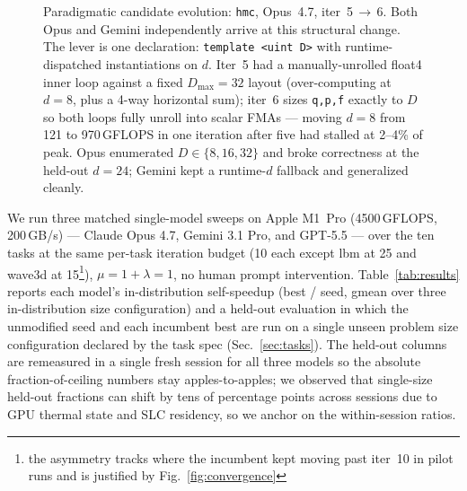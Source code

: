 \documentclass{article}
\theoremstyle{plain}
\theoremstyle{definition}
\theoremstyle{remark}
\begin{document}
\begin{figure}[!t]
\caption{Paradigmatic candidate evolution: \texttt{hmc}, Opus~4.7, iter~5\,$\rightarrow$\,6.
Both Opus and Gemini independently arrive at this structural change.
The lever is one declaration: \texttt{template <uint D>}
with runtime-dispatched instantiations on $d$. Iter~5 had a
manually-unrolled float4 inner loop against a fixed $D_{\max}{=}32$ layout
(over-computing at $d{=}8$, plus a 4-way horizontal sum); iter~6 sizes
\texttt{q,p,f} exactly to $D$ so both loops fully unroll into scalar FMAs ---
moving $d{=}8$ from 121 to 970\,GFLOPS in one iteration after five had
stalled at 2--4\% of peak. Opus enumerated $D{\in}\{8,16,32\}$ and broke
correctness at the held-out $d{=}24$; Gemini kept a runtime-$d$ fallback
and generalized cleanly.}
\label{fig:hmc-evol}
\end{figure}

We run three matched single-model sweeps on Apple M1~Pro (4500\,GFLOPS, 200\,GB/s) ---
Claude Opus 4.7, Gemini 3.1 Pro, and
GPT-5.5 --- over the ten tasks at the same per-task
iteration budget (10 each except lbm at 25 and wave3d at 15\footnote{the asymmetry tracks where the incumbent kept moving past iter~10
in pilot runs and is justified by
Fig.~\ref{fig:convergence}}),
$\mu{=}1{+}\lambda{=}1$, no human prompt intervention.
Table~\ref{tab:results} reports each model's in-distribution self-speedup
(best / seed, gmean over three in-distribution size configuration) and a held-out evaluation
in which the unmodified seed and each incumbent best are run on a single
unseen problem size configuration declared by the task spec (Sec.~\ref{sec:tasks}).
The held-out columns are remeasured in a single fresh session for all
three models so the absolute fraction-of-ceiling numbers stay
apples-to-apples; we observed that single-size held-out fractions can
shift by tens of percentage points across sessions due to GPU thermal
state and SLC residency, so we anchor on the within-session ratios.
\end{document}
